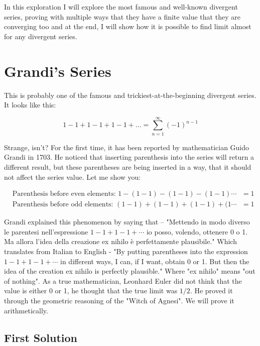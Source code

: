 \documentclass[11pt]{article}
\begin{document}
In this exploration I will explore the most famous and
well-known divergent series, proving with multiple ways that they have a finite
value that they are converging too and at the end, I will show how it is
possible to find limit almost for any divergent series.

\section{Grandi's Series}
\label{sec:orgccccc17}
\label{orgd6128cd}

This is probably one of the famous and trickiest-at-the-beginning divergent series. It looks like
this: 

\begin{equation}
1-1+1-1+1-1+...=\sum_{n=1}^{\infty} (-1)^{n-1}
\end{equation}

Strange, isn't? For the first time, it has been reported by mathematician Guido
Grandi in 1703. He noticed that inserting parenthesis into the series will
return a different result, but these parentheses are being inserted in a way,
that it should not affect the series value. Let me show you:  

\begin{align*}
&\text{Parenthesis before even elements: } 1-(1-1)-(1-1)-(1-1)\cdots&=1\\
&\text{Parenthesis before odd elements: } (1-1)+(1-1)+(1-1)+(1\cdots&=1
\end{align*}

Grandi explained this phenomenon by saying that – "Mettendo in modo diverso le
parentesi nell'espressione \(1-1+1-1+\cdots\) io posso, volendo, ottenere 0 o 1. Ma
allora l'idea della creazione ex nihilo è perfettamente
plausibile."\cite{Mettendo} Which translates from Italian to English - "By putting
parentheses into the expression \(1-1+1-1+\cdots\) in different ways, I can, if I
want, obtain 0 or 1. But then the idea of the creation ex nihilo is perfectly
plausible." Where "ex nihilo" means "out of nothing".\cite{Exnihilo} As a true
mathematician, Leonhard Euler did not think that the value is either 0 or 1, he
thought that the true limit was \(1/2\). He proved it through the geometric
reasoning of the "Witch of Agnesi". We will prove it arithmetically.

\subsection{First Solution}
\label{sec:org93090d4}
\label{orgdeb8e3d}
\end{document}
